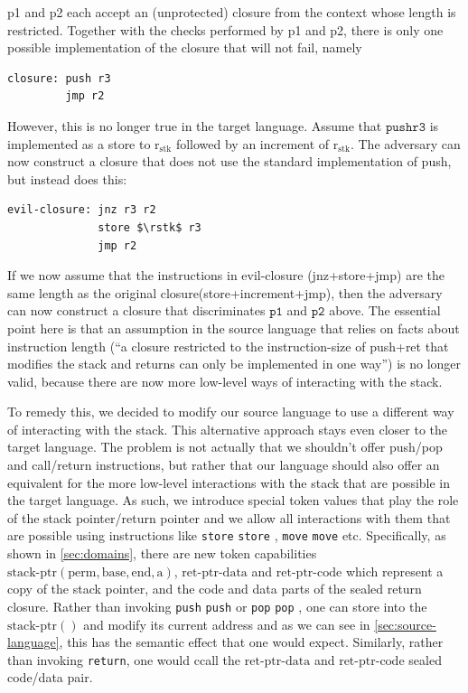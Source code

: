 \documentclass[a3paper]{article}
\newcommand{\sourcecolor}{\color{blue}}
\newcommand{\src}[1]{{\sourcecolor #1}}
\newcommand{\targetcolor}[1]{\color{black}}
\newcommand{\zinstr}[1]{\texttt{#1}}
\newcommand{\oneinstr}[2]{
  \ifthenelse{\equal{#2}{}}
  {\zinstr{#1}}
  {\zinstr{#1} \; #2}
}
\newcommand{\twoinstr}[3]{
  \ifthenelse{\equal{#2#3}{}}
  {\zinstr{#1}}
  {\zinstr{#1} \; #2 \; #3}
}
\newcommand{\sreturn}{\zinstr{\src{return}}}
\newcommand{\spush}[1]{\oneinstr{\src{push}}{#1}}
\newcommand{\spop}[1]{\oneinstr{\src{pop}}{#1}}
\newcommand{\smove}[2]{\twoinstr{\src{move}}{#1}{#2}}
\newcommand{\sstore}[2]{\twoinstr{\src{store}}{#1}{#2}}
\newcommand{\shareddom}[1]{\mathrm{#1}}
\newcommand{\permbnf}{\shareddom{perm}}
\newcommand{\addrbnf}{\shareddom{a}}
\newcommand{\basebnf}{\shareddom{base}}
\newcommand{\aendbnf}{\shareddom{end}}
\newcommand{\stkptr}[1]{\mathrm{stack\text{-}ptr}(#1)}
\newcommand{\retptrd}{\mathrm{ret\text{-}ptr\text{-}data}}
\newcommand{\retptrc}{\mathrm{ret\text{-}ptr\text{-}code}}
\newcommand{\rstk}{\mathrm{r}_\mathrm{stk}}
\begin{document}
p1 and p2 each accept an (unprotected) closure from the context whose length is restricted.
Together with the checks performed by p1 and p2, there is only one possible implementation of the closure that will not fail, namely
\begin{lstlisting}[basicstyle=\sourcecolor{}\ttfamily] 
closure: push r3
         jmp r2
\end{lstlisting}

However, this is no longer true in the target language.
Assume that $\mathtt{push r3}$ is implemented as a store to $\rstk$ followed by an increment of $\rstk$.
The adversary can now construct a closure that does not use the standard implementation of push, but instead does this:
\begin{lstlisting}[basicstyle=\targetcolor{}\ttfamily] 
evil-closure: jnz r3 r2
              store $\rstk$ r3
              jmp r2
\end{lstlisting}
If we now assume that the instructions in evil-closure (jnz+store+jmp) are the same length as the original closure(store+increment+jmp), then the adversary can now construct a closure that discriminates $\mathtt{p1}$ and $\mathtt{p2}$ above.
The essential point here is that an assumption in the source language that relies on facts about instruction length (``a closure restricted to the instruction-size of push+ret that modifies the stack and returns can only be implemented in one way'') is no longer valid, because there are now more low-level ways of interacting with the stack.

To remedy this, we decided to modify our source language to use a different way of interacting with the stack.
This alternative approach stays even closer to the target language.
The problem is not actually that we shouldn't offer push/pop and call/return instructions, but rather that our language should also offer an equivalent for the more low-level interactions with the stack that are possible in the target language.
As such, we introduce special token values that play the role of the stack pointer/return pointer and we allow all interactions with them that are possible using instructions like \sstore{}{}, \smove{}{} etc.
Specifically, as shown in \cref{sec:domains}, there are new token capabilities $\stkptr{\permbnf,\basebnf,\aendbnf,\addrbnf}$, $\retptrd$ and $\retptrc$ which represent a copy of the stack pointer, and the code and data parts of the sealed return closure.
Rather than invoking \spush{} or \spop{}, one can store into the $\stkptr{}$ and modify its current address and as we can see in \cref{sec:source-language}, this has the semantic effect that one would expect.
Similarly, rather than invoking \sreturn{}, one would ccall the $\retptrd$ and $\retptrc$ sealed code/data pair.
\end{document}
